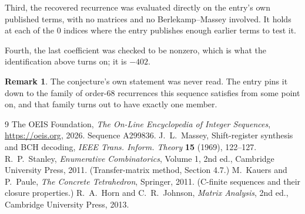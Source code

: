 \documentclass[11pt,a4paper]{article}
\theoremstyle{plain}
\theoremstyle{definition}
\newtheorem{remark}[theorem]{Remark}
\begin{document}
Third, the recovered recurrence was evaluated directly on the entry's own published terms, with
no matrices and no Berlekamp--Massey involved. It holds at each of the $0$ indices where
the entry publishes enough earlier terms to test it.

Fourth, the last coefficient was checked to be nonzero, which is what the identification above
turns on; it is $-402$.

\begin{remark}
The conjecture's own statement was never read. The entry pins it down to the family of
order-$68$ recurrences this sequence satisfies from some point on, and that family turns
out to have exactly one member.
\end{remark}

\begin{thebibliography}{9}
 The OEIS Foundation, \emph{The On-Line Encyclopedia of Integer
Sequences}, \url{https://oeis.org}, 2026. Sequence A299836.
 J.~L.~Massey, Shift-register synthesis and BCH decoding, \emph{IEEE
Trans. Inform. Theory} \textbf{15} (1969), 122--127.
 R.~P.~Stanley, \emph{Enumerative Combinatorics}, Volume 1, 2nd ed.,
Cambridge University Press, 2011. (Transfer-matrix method, Section 4.7.)
 M.~Kauers and P.~Paule, \emph{The Concrete Tetrahedron}, Springer, 2011.
(C-finite sequences and their closure properties.)
 R.~A.~Horn and C.~R.~Johnson, \emph{Matrix Analysis}, 2nd ed., Cambridge
University Press, 2013.
\end{thebibliography}
\end{document}
